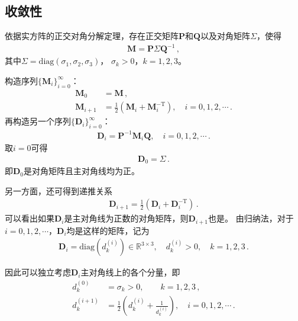 \subsection{收敛性}\label{sub:收敛性02ex02}
\begin{prove}
    依据实方阵的正交对角分解定理，存在正交矩阵$\bm P$和$\bm Q$以及对角矩阵$\bm \varSigma$，使得
    \begin{align}\label{eq:02ex.04}
        \bm M=\bm P\bm \varSigma\bm Q^{-1}\, ,
    \end{align}
    其中${\bm \varSigma}=\mathrm{diag}(\sigma_1,\sigma_2,\sigma_3)$，
    $\sigma_k>0$，$k=1,2,3$。

    构造序列$\displaystyle\{\bm M_i\}_{i=0}^{\infty}$：
    \begin{align}
        \bm M_0     & =\bm M\, ,                                                           \\
        \bm M_{i+1} & =\frac{1}{2}(\bm M_i+\bm M_i^{-\mathrm{T}}),\quad i=0,1,2,\cdots\, .
    \end{align}
    再构造另一个序列$\displaystyle\{\bm D_i\}_{i=0}^{\infty}$：
    \begin{align}
        \bm D_i=\bm P^{-1}\bm M_i\bm Q,\quad i=0,1,2,\cdots\, .
    \end{align}
    取$i=0$可得
    \begin{align}
        \bm D_0=\bm \varSigma\, .
    \end{align}
    即$\bm D_0$是对角矩阵且主对角线均为正。

    另一方面，还可得到递推关系
    \begin{align}
        \bm D_{i+1}=\frac{1}{2}(\bm D_i+\bm D_i^{-\mathrm{T}})\, .
    \end{align}
    可以看出如果$\bm D_i$是主对角线为正数的对角矩阵，则$\bm D_{i+1}$也是。
    由归纳法，对于$i=0,1,2,\cdots$，$\bm D_i$均是这样的矩阵，记为
    \begin{align}
        \bm D_i=\mathrm{diag}\left(d_k^{(i)}\right)\in\mathbb{R}^{3\times 3}, \quad d_k^{(i)}>0, \quad k=1,2,3\, .
    \end{align}

    因此可以独立考虑$\bm D_i$主对角线上的各个分量，即
    \begin{align}
        d_k^{(0)}   & =\sigma_k>0,\qquad k=1,2,3\, ,                                                                     \\
        d_k^{(i+1)} & = \frac{1}{2}\left(d_k^{(i)}+\frac{1}{d_k^{(i)}}\right),\quad i=0,1,2,\cdots\label{eq:02ex.03}\, .
    \end{align}


\end{prove}
